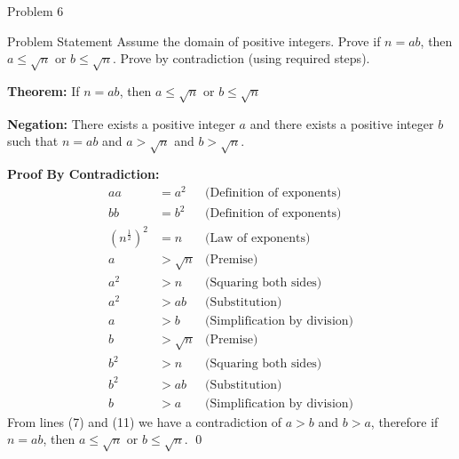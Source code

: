 \begin{problem}{Problem 6}
    \begin{statement}{Problem Statement}
        Assume the domain of positive integers. Prove if $n = ab$, then $a \leq \sqrt{n}$ or $b \leq \sqrt{n}$. Prove by contradiction (using required steps).
    \end{statement}

    \begin{highlight}[Solution]
        \textbf{Theorem:} If $n = ab$, then $a \leq \sqrt{n}$ or $b \leq \sqrt{n}$ \vspace*{1em}

        \textbf{Negation:} There exists a positive integer $a$ and there exists a positive integer $b$ such that $n = ab$ and $a > \sqrt{n}$ and $b > \sqrt{n}$. \vspace*{1em}

        \textbf{Proof By Contradiction:} \newline
        \setcounter{equation}{0}
        \begin{align}
            aa & = a^{2} & \text{(Definition of exponents)} \\
            bb & = b^{2} & \text{(Definition of exponents)} \\
            (n^{\frac{1}{2}})^2 & = n & \text{(Law of exponents)} \\
            a & > \sqrt{n} & \text{(Premise)} \\
            a^{2} & > n & \text{(Squaring both sides)} \\
            a^{2} & > ab & \text{(Substitution)} \\
            a & > b & \text{(Simplification by division)} \\
            b & > \sqrt{n} & \text{(Premise)} \\
            b^{2} & > n & \text{(Squaring both sides)} \\
            b^{2} & > ab & \text{(Substitution)} \\
            b & > a & \text{(Simplification by division)}
        \end{align}
        From lines (7) and (11) we have a contradiction of $a > b$ and $b > a$, therefore if $n = ab$, then $a \leq \sqrt{n}$ or $b \leq \sqrt{n}$. \qed
    \end{highlight}
\end{problem}

